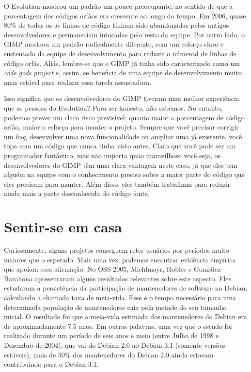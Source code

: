 O Evolution mostrou um padrão um pouco preocupante, no sentido de que a porcentagem
dos códigos orfãos era crescente ao longo do tempo. Em 2006, quase 80\% de todas as
as linhas de código tinham sido abandonadas pelos antigos desenvolvedores e permaneciam
intocadas pelo resto da equipe. Por outro lado, o GIMP mostrou um padrão radicalmente
diferente, com um esforço claro e sustentado da equipe de desenvolvimento para reduzir o
númerod de linhas de código orfãs. Aliás, lembre-se que o GIMP já tinha sido caracterizado
como um \textit {code gods project} e, assim, se beneficia de uma equipe de desenvolvimento
muito mais estável para realizar essa tarefa assustadora.

Isso significa que os desenvolvedores do GIMP tiveram uma melhor experiência que
as pessoas do Evolution? Para ser honesto, não sabemos. No entanto, podemos prever um
claro risco previsível: quanto maior a porcentagem de código orfão, maior o esforço para
manter o projeto. Sempre que você precisar corrigir um \textit {bug}, desenvolver uma
nova funcionalidade ou ampliar uma já existente, você topa com um código que nunca tinha
visto antes. Claro que você pode ser um programador fantástico, mas não importa quão maravilhoso
você seja, os desenvolvedores do GIMP têm uma clara vantagem neste caso, já que eles tem alguém
na equipe com o conhecimento preciso sobre a maior parte do código que eles precisam para manter.
Além disso, eles também trabalham para reduzir ainda mais a parte desconhecida do código fonte.

\section*{Sentir-se em casa}

Curiosamente, alguns projetos conseguem reter usuários por períodos muito maiores
que o esperado. Mais uma vez, podemos encontrar evidência empírica que apoiam essa 
afirmação. No OSS 2005, Michlmayr, Robles e González-Barahona apresentaram alguns
resultados relevantes sobre este aspecto. Eles estudaram a persistência da participação
de mantenedores de software no Debian, calculando a chamada taxa de meia-vida. 
Esse é o tempo necessário para uma determinada população de mantenedores caia pela
metade do seu tamanho inicial. O resultado foi que a meia-vida estimada dos mantenedores
do Debian era de aproximadamente 7.5 anos. Em outras palavras, uma vez que o estudo
foi realizado durante um período de seis anos e meio (entre Julho de 1998 e
Dezembro de 2004), que vai do Debian 2.0 ao Debian 3.1 (somente versões estáveis),
mais de 50\% dos mantenedores do Debian 2.0 ainda estavam contribuindo para o Debian
3.1.

